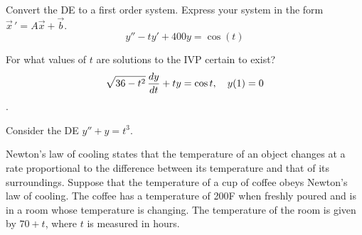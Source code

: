 \documentclass[12pt]{exam}
\begin{document}
    


\newpage


\InitialsRight

\begin{questions}

    \question[2] Convert the DE to a first order system. Express your system in the form $\vec x \, ' = A\vec x +\vec b$. 
    $$y''-ty'+400y = \cos(t)$$
    
    \vspace{6cm}
    
    \question[1] For what values of $t$ are solutions to the IVP certain to exist? $$\sqrt{36-t^2} \, {\frac{dy}{dt}} + t y = \cos t, \quad y(1) = 0$$.
    
    \vspace{4cm}
    
    \question[2] Consider the DE $y''+ y = t^3$.
    
    \newpage 

    \question[6]  Newton’s law of cooling states that the temperature of an object changes at a rate proportional to the difference between its temperature and that of its surroundings. Suppose that the temperature of a cup of coffee obeys Newton’s law of cooling. The coffee has a temperature of 200F when freshly poured and is in a room whose temperature is changing. The temperature of the room is given by $70+t$, where $t$ is measured in hours. 
    \begin{parts}

\end{parts}
\end{questions}
\end{document}
